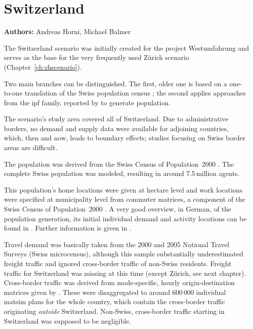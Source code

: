 \chapter{Switzerland}
\label{ch:switzerland-scenario}
\hfill \textbf{Authors:} Andreas Horni, Michael Balmer


The Switzerland scenario was initially created for the project Westumfahrung \citep[][]{BalmerEtAl_ResRep_bdktzrh_2009} and serves as the base for the very frequently used Zürich scenario (Chapter~\ref{ch:zhscenario}). 

Two main branches can be distinguished. The first, older one is based on a one-to-one translation of the Swiss population census \citep[][]{BfS_VZ_2000}; the second applies approaches from the \gls{ipf} family, reported by \citet[][]{MuellerKAxhausen_TechRep_IVT_2013, Mueller_unpub_LATSIS_2012, Mueller_unpub_ETC_2011, Mueller_unpub_STRC_2011, Mueller_unpub_IATBR_2012} to generate population.

The scenario's study area covered all of Switzerland. Due to administrative borders, no demand and supply data were available for adjoining countries, which, then and now, leads to boundary effects; studies focusing on Swiss border areas are difficult.

The population was derived from the Swiss Census of Population~2000 \citep[][]{BfS_VZ_2000}. The complete Swiss population was modeled, resulting in around 7.5\,million agents. 

This population's home locations were given at hectare level and work locations were specified at municipality level from commuter matrices, a component of the Swiss Census of Population~2000 \citep[][p.35]{BalmerEtAl_ResRep_bdktzrh_2009}. A very good overview, in German, of the population generation, its initial individual demand and activity locations can be found in \citet{MeisterEtAl_SVT_2009}. Further information is given in \citet[][]{CiariEtAl_STRC_2008, MeisterEtAl_WCTRS_2010, BalmerEtAl_ResRep_bdktzrh_2009, BalmerEtAl_ResRep_datapuls_2010,%
BalmerEtc2008matsim-arch-perf-MAS-TT%
}.

Travel demand was basically taken from the 2000 and 2005 National Travel Surveys \citep[][]{BfS-MZ2005_manual_2006} (Swiss microcensus), although this sample substantially underestimated freight traffic and ignored cross-border traffic of non-Swiss residents. Freight traffic for Switzerland was missing at this time (except Zürich, see next chapter). Cross-border traffic was derived from mode-specific, hourly origin-destination matrices given by \citet[][]{VrticEtAl_ResRep_UVEK_2007}. These were disaggregated to around 600\,000 individual \gls{matsim} plans for the whole country, which contain the cross-border traffic originating \emph{outside} Switzerland. Non-Swiss, cross-border traffic starting in Switzerland was supposed to be negligible. 

